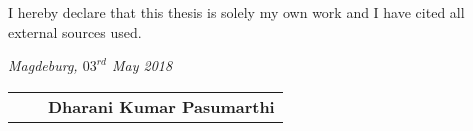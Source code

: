\label{declaration}

I hereby declare that this thesis is solely my own work and I have cited all external sources used.
\newline
\par\textit{Magdeburg, \(03^{rd}\) May 2018}


\begin{tabular}{p{}cp{}}
   \cline{3-3} \\
   & & \centering \textbf{Dharani Kumar Pasumarthi} 
\end{tabular}